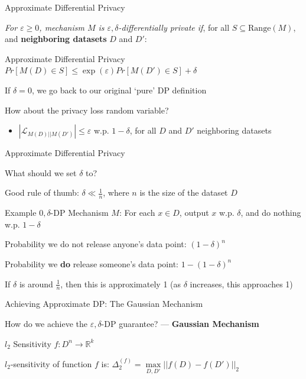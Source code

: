 \documentclass[12pt,aspectratio=169]{beamer}
\begin{document}
\begin{frame}{Approximate Differential Privacy}

\textit{For $\varepsilon \geq 0$, mechanism $M$ is $\varepsilon, \delta$-differentially private if}, for all $S \subseteq \text{Range}(M)$, and \textbf{neighboring datasets} $D$ and $D'$:

\begin{block}{Approximate Differential Privacy}
$Pr[M(D) \in S] \leq \exp (\varepsilon) Pr[M(D') \in S] + \delta$
\end{block}

If $\delta = 0$, we go back to our original `pure' DP definition

How about the privacy loss random variable?
\begin{itemize}
    \item[] $|\mathcal{L}_{M(D) || M(D')}| \leq \varepsilon$ w.p. $1 - \delta$, for all $D$ and $D'$ neighboring datasets
\end{itemize}

\end{frame}

\begin{frame}{Approximate Differential Privacy}

What should we set $\delta$ to?

Good rule of thumb: $\delta \ll \frac{1}{n}$, where $n$ is the size of the dataset $D$

\begin{block}{Example $0, \delta$-DP Mechanism}
  $M$: For each $x \in D$, output $x$ w.p. $\delta$, and do nothing w.p. $1 - \delta$
\end{block}

Probability we do not release anyone's data point: $(1 - \delta)^n$

Probability we \textbf{do} release someone's data point: $1 - (1 - \delta)^n$

If $\delta$ is around $\frac{1}{n}$, then this is approximately 1 (as $\delta$ increases, this approaches 1)

\end{frame}

\begin{frame}{Achieving Approximate DP: The Gaussian Mechanism}

How do we achieve the $\varepsilon, \delta$-DP guarantee? --- \textbf{Gaussian Mechanism}

\begin{block}{$l_2$ Sensitivity}
$f: D^n \rightarrow \mathbb{R}^k$

$l_2$-sensitivity of function $f$ is: $\Delta_2^{(f)} = \underset{D, D'}{\max} ||f(D) - f(D')||_2$
\end{block}

\end{frame}
\end{document}
